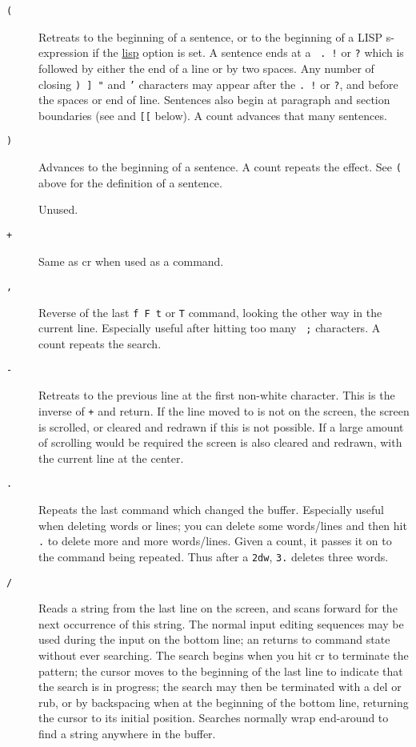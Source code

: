 \begin{description}
\item[{\tt (}] Retreats to the beginning of a sentence, or to the beginning of
a LISP s-expression if the \ul{lisp} option is set. A sentence ends at a {\tt
.~!} or {\tt ?} which is followed by either the end of a line or by two
spaces. Any number of closing {\tt ) ] "} and {\tt '} characters may appear
after the {\tt .~!} or {\tt ?}, and before the spaces or end of line.
Sentences also begin at paragraph and section boundaries (see
{\tt{}} and {\tt [[} below). A count advances that many sentences.

\item[{\tt )}] Advances to the beginning of a sentence. A count repeats the
effect. See {\tt (} above for the definition of a sentence.

\item[{\tt *}] Unused.

\item[{\tt +}] Same as {\sc cr} when used as a command.

\item[{\tt ,}] Reverse of the last {\tt f F t} or {\tt T} command, looking the
other way in the current line. Especially useful after hitting too many {\tt
;} characters. A count repeats the search.

\item[{\tt -}] Retreats to the previous line at the first non-white character.
This is the inverse of {\tt +} and {\sc return}. If the line moved to is not
on the screen, the screen is scrolled, or cleared and redrawn if this is not
possible.  If a large amount of scrolling would be required the screen is also
cleared and redrawn, with the current line at the center.

\item[{\tt .}] Repeats the last command which changed the buffer. Especially
useful when deleting words or lines; you can delete some words/lines and then
hit {\tt .} to delete more and more words/lines. Given a count, it passes it
on to the command being repeated. Thus after a {\tt 2dw}, {\tt 3.} deletes
three words.

\item[{\tt /}] Reads a string from the last line on the screen, and scans
forward for the next occurrence of this string. The normal input editing
sequences may be used during the input on the bottom line; an returns to
command state without ever searching. The search begins when you hit {\sc cr}
to terminate the pattern; the cursor moves to the beginning of the last line
to indicate that the search is in progress; the search may then be terminated
with a {\sc del} or {\sc rub}, or by backspacing when at the beginning of the
bottom line, returning the cursor to its initial position.  Searches normally
wrap end-around to find a string anywhere in the buffer.


\end{description}
